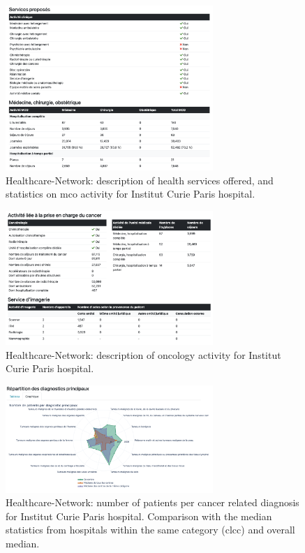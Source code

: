 \begin{figure}[H]
    \includegraphics[width=0.7\textwidth]{images/healthcare-network/curie-services.png}
    \centering
    \caption{
        Healthcare-Network: description of health services offered, and statistics on \ac{mco} activity for Institut Curie Paris hospital.
    }
    \label{fig:hn-curie-services}
\end{figure}


\begin{figure}[H]
    \includegraphics[width=0.7\textwidth]{images/healthcare-network/curie-cancero.png}
    \centering
    \caption{
        Healthcare-Network: description of oncology activity for Institut Curie Paris hospital.
    }
    \label{fig:hn-curie-cancero}
\end{figure}


\begin{figure}[H]
    \includegraphics[width=0.7\textwidth]{images/healthcare-network/curie-dp.png}
    \centering
    \caption{
        Healthcare-Network: number of patients per cancer related diagnosis for Institut Curie Paris hospital. Comparison with the median statistics from hospitals within the same category (\ac{clcc}) and overall median.
    }
    \label{fig:hn-curie-dp}
\end{figure}


